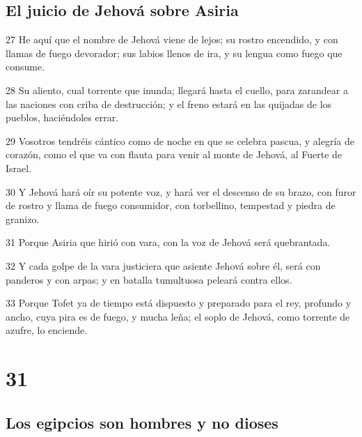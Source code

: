\section*{El juicio de Jehová sobre Asiria}

\par 27 He aquí que el nombre de Jehová viene de lejos; su rostro encendido, y con llamas de fuego devorador; sus labios llenos de ira, y su lengua como fuego que consume.
\par 28 Su aliento, cual torrente que inunda; llegará hasta el cuello, para zarandear a las naciones con criba de destrucción; y el freno estará en las quijadas de los pueblos, haciéndoles errar.
\par 29 Vosotros tendréis cántico como de noche en que se celebra pascua, y alegría de corazón, como el que va con flauta para venir al monte de Jehová, al Fuerte de Israel.
\par 30 Y Jehová hará oír su potente voz, y hará ver el descenso de su brazo, con furor de rostro y llama de fuego consumidor, con torbellino, tempestad y piedra de granizo.
\par 31 Porque Asiria que hirió con vara, con la voz de Jehová será quebrantada.
\par 32 Y cada golpe de la vara justiciera que asiente Jehová sobre él, será con panderos y con arpas; y en batalla tumultuosa peleará contra ellos.
\par 33 Porque Tofet ya de tiempo está dispuesto y preparado para el rey, profundo y ancho, cuya pira es de fuego, y mucha leña; el soplo de Jehová, como torrente de azufre, lo enciende.

\chapter{31}

\section*{Los egipcios son hombres y no dioses}

